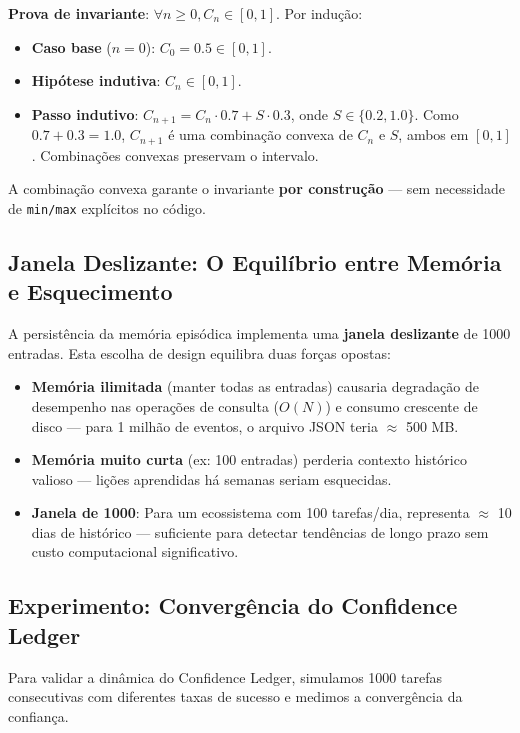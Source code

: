 \textbf{Prova de invariante}: $\forall n \geq 0, C_n \in [0, 1]$. Por indução:

\begin{itemize}
    \item \textbf{Caso base} ($n = 0$): $C_0 = 0.5 \in [0, 1]$. \checkmark
    \item \textbf{Hipótese indutiva}: $C_n \in [0, 1]$.
    \item \textbf{Passo indutivo}: $C_{n+1} = C_n \cdot 0.7 + S \cdot 0.3$, onde $S \in \{0.2, 1.0\}$. Como $0.7 + 0.3 = 1.0$, $C_{n+1}$ é uma combinação convexa de $C_n$ e $S$, ambos em $[0, 1]$. Combinações convexas preservam o intervalo. \checkmark
\end{itemize}

A combinação convexa garante o invariante \textbf{por construção} — sem necessidade de \texttt{min/max} explícitos no código.

\subsection{Janela Deslizante: O Equilíbrio entre Memória e Esquecimento}

A persistência da memória episódica implementa uma \textbf{janela deslizante} de 1000 entradas. Esta escolha de design equilibra duas forças opostas:

\begin{itemize}
    \item \textbf{Memória ilimitada} (manter todas as entradas) causaria degradação de desempenho nas operações de consulta ($O(N)$) e consumo crescente de disco — para 1 milhão de eventos, o arquivo JSON teria $\approx$ 500 MB.
    \item \textbf{Memória muito curta} (ex: 100 entradas) perderia contexto histórico valioso — lições aprendidas há semanas seriam esquecidas.
    \item \textbf{Janela de 1000}: Para um ecossistema com 100 tarefas/dia, representa $\approx$ 10 dias de histórico — suficiente para detectar tendências de longo prazo sem custo computacional significativo.
\end{itemize}

\subsection{Experimento: Convergência do Confidence Ledger}

Para validar a dinâmica do Confidence Ledger, simulamos 1000 tarefas consecutivas com diferentes taxas de sucesso e medimos a convergência da confiança.


